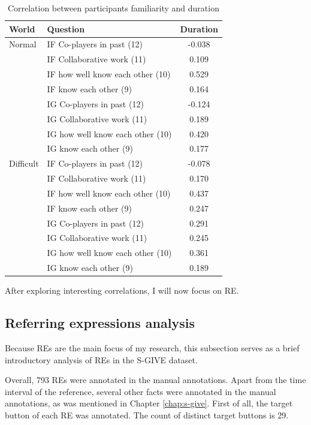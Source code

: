 \begin{table}[!htbp]
 \centering
\begin{tabular}{llc}
\toprule
World & Question  & Duration \\
\midrule
Normal 	& IF Co-players in past (12) 	& -0.038\\
 		& IF Collaborative work 	(11)		& 0.109	 \\
 		& IF how well know each other (10)		& 0.529\\
 		& IF know each other (9)			& 0.164	\\
 		& IG Co-players in past (12) 	& -0.124\\
 		& IG Collaborative work 	(11)		& 0.189	 \\
 		& IG how well know each other (10)		& 0.420\\
 		& IG know each other (9)			& 0.177	\\ 		
\midrule
Difficult& IF Co-players in past (12) 	& -0.078\\
 		& IF Collaborative work 	(11)		& 0.170	 \\
  		& IF how well know each other (10)		& 0.437\\
 		& IF know each other (9)			& 0.247	\\
 		& IG Co-players in past (12) 	& 0.291\\
 		& IG Collaborative work 	(11)		& 0.245	 \\
 		& IG how well know each other (10)		& 0.361\\
 		& IG know each other (9)			& 0.189	\\
\bottomrule
\end{tabular}
\caption{Correlation between participants familiarity and duration}
\label{tab:demfactors-famother}
\end{table}

After exploring interesting correlations, I will now focus on RE.

\subsection{Referring expressions analysis}
Because REs are the main focus of my research, this subsection serves as a brief introductory analysis of REs in the S-GIVE dataset.

Overall, 793 REs were annotated in the manual annotations. Apart from the time interval of the reference, several other facts were annotated in the manual annotations, as was mentioned in Chapter \ref{chap:s-give}. First of all, the target button of each RE was annotated. The count of distinct target buttons is 29.  

